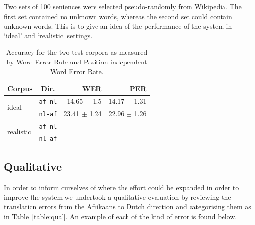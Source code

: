 \documentclass[11pt]{article}
\begin{document}
Two sets of 100 sentences were selected pseudo-randomly from Wikipedia. The first set contained 
no unknown words, whereas the second set could contain unknown words. This is to give an idea
of the performance of the system in `ideal' and `realistic' settings.

\begin{table}
  \begin{center}
  \begin{tabular}{|l|c|r|r|}
   \hline
   {\bf Corpus}                & {\bf Dir.}  & {\bf WER}    & {\bf PER}\\
   \hline
   \multirow{2}{*}{ideal}      &  {\small {\tt af-nl}}      & 14.65 $\pm$ 1.5        &  14.17 $\pm$ 1.31 \\ 
                               &  {\small {\tt nl-af}}      & 23.41 $\pm$ 1.24     & 22.96 $\pm$ 1.26 \\
   \hline
   \multirow{2}{*}{realistic}  &  {\small {\tt af-nl}}      &              &  ~ \\ 
                               &  {\small {\tt nl-af}}      &              & ~ \\
   \hline
  \end{tabular}
    \caption{Accuracy for the two test corpora as measured by Word Error Rate 
        and Position-independent Word Error Rate.}
    \label{table:quan}
  \end{center}
\end{table}


\subsection{Qualitative}

In order to inform ourselves of where the effort could be expanded in order to improve the 
system we undertook a qualitative evaluation by reviewing the translation errors from the Afrikaans
to Dutch direction and categorising them as in Table~\ref{table:qual}. An example of each 
of the kind of error is found below.
\end{document}
